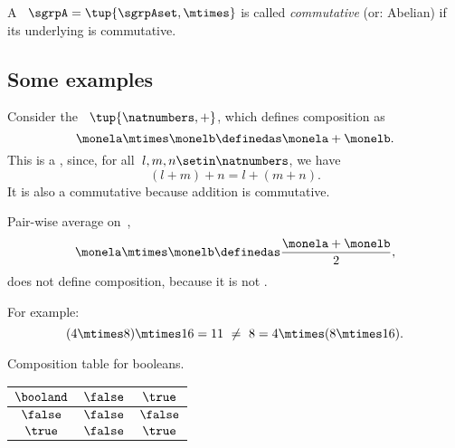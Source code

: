 \begin{definition}\label{def:commutative-semigroup}
    A ~$\sgrpA = \tup{\sgrpAset, \mtimes}$ is called \emph{commutative} (or: Abelian) if its underlying  is commutative.
\end{definition}

\subsection{Some examples}

\begin{example}
    \label{exa:natnum-semigroup}
    Consider the ~$\tup{\natnumbers,+}$, which defines composition as
    \begin{equation}
        \label{eq:natnum-semigroup-definition}
        \monela \mtimes \monelb \definedas \monela + \monelb.
    \end{equation}
    This is a , since, for all~$l,m, n \setin \natnumbers$, we have
    \begin{equation}
        (l+m)
        +n = l+(m+n).
    \end{equation}
    It is also a commutative  because addition is commutative.
\end{example}

\begin{example}
    Pair-wise average on~\reals,
    \begin{equation}
        \label{eq:pairwise}
        \monela \mtimes \monelb \definedas \frac{\monela + \monelb}{2},
    \end{equation}
    does not define  composition, because it is not .

    For example:
    \begin{equation}
        \label{eq:pairwise-counterexample}
        (4 \mtimes 8) \mtimes 16 = 11\ \neq\ 8 = 4 \mtimes (8 \mtimes 16).
    \end{equation}
\end{example}

\begin{margintable}
    \caption{Composition table for booleans.}
    \label{tab:comp-table-bool}
    \centering
    \begin{tabular}{c|cc}
        $\booland$ & $\false$ & $\true$ \\
        \hline
        $\false$   & $\false$ & $\false$ \\
        $\true$    & $\false$ & $\true$
    \end{tabular}
\end{margintable}

